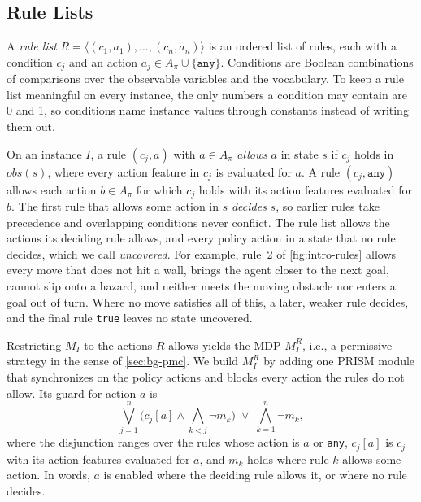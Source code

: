 \subsection{Rule Lists}
\label{sec:rules}

A \textit{rule list} $R = \langle (c_1, a_1), \ldots, (c_n, a_n) \rangle$ is an ordered list of rules, each with a condition $c_j$ and an action $a_j \in A_\pi \cup \{\texttt{any}\}$.
Conditions are Boolean combinations of comparisons over the observable variables and the vocabulary.
To keep a rule list meaningful on every instance, the only numbers a condition may contain are 0 and 1, so conditions name instance values through constants instead of writing them out.

On an instance $I$, a rule $(c_j, a)$ with $a \in A_\pi$ \textit{allows} $a$ in state $s$ if $c_j$ holds in $\mathit{obs}(s)$, where every action feature in $c_j$ is evaluated for $a$.
A rule $(c_j, \texttt{any})$ allows each action $b \in A_\pi$ for which $c_j$ holds with its action features evaluated for $b$.
The first rule that allows some action in $s$ \textit{decides} $s$, so earlier rules take precedence and overlapping conditions never conflict.
The rule list allows the actions its deciding rule allows, and every policy action in a state that no rule decides, which we call \textit{uncovered}.
For example, rule~2 of \autoref{fig:intro-rules} allows every move that does not hit a wall, brings the agent closer to the next goal, cannot slip onto a hazard, and neither meets the moving obstacle nor enters a goal out of turn.
Where no move satisfies all of this, a later, weaker rule decides, and the final rule \texttt{true} leaves no state uncovered.

Restricting $M_I$ to the actions $R$ allows yields the MDP $M_I^R$, i.e., a permissive strategy in the sense of \autoref{sec:bg-pmc}.
We build $M_I^R$ by adding one PRISM module that synchronizes on the policy actions and blocks every action the rules do not allow.
Its guard for action $a$ is
\begin{equation}
\label{eq:guard}
\bigvee_{j=1}^{n} \Big( c_j[a] \wedge \bigwedge_{k < j} \neg m_k \Big) \;\vee\; \bigwedge_{k=1}^{n} \neg m_k,
\end{equation}
where the disjunction ranges over the rules whose action is $a$ or \texttt{any}, $c_j[a]$ is $c_j$ with its action features evaluated for $a$, and $m_k$ holds where rule $k$ allows some action.
In words, $a$ is enabled where the deciding rule allows it, or where no rule decides.

